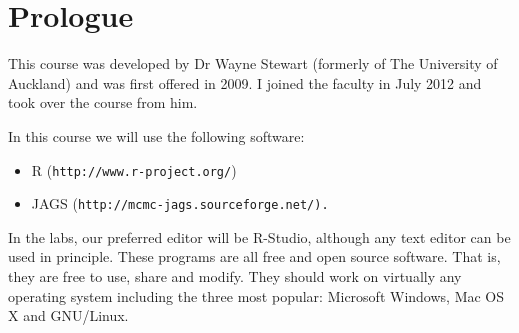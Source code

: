 \section{Prologue}

This course was developed by Dr Wayne Stewart (formerly of The University of
Auckland) and was first offered in 2009. I joined the faculty in July 2012
and took over the course from him.

In this course we will use the following software:
\begin{itemize}
\item R ({\tt http://www.r-project.org/})
\item JAGS (\tt http://mcmc-jags.sourceforge.net/).
\end{itemize}

In the labs, our preferred editor will be R-Studio, although any text editor
can be used in principle. These programs are all free and open source software.
That is, they are free to use, share and modify. They should work on
virtually any operating system including the three most popular:
Microsoft Windows, Mac OS X and GNU/Linux.

